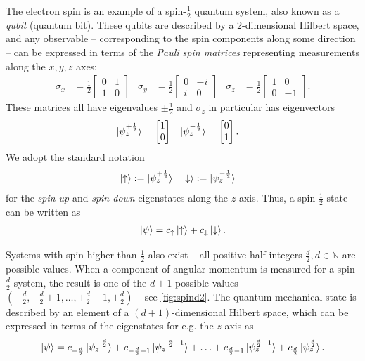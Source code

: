 \documentclass[final,3p,mathptmx]{elsarticle}
\begin{document}
The electron spin is an example of a spin-{$\frac{1}{2}$} quantum system, also known as a \emph{qubit} (quantum bit). These qubits are described by a 2-dimensional Hilbert space, and any observable -- corresponding to the spin components along some direction -- can be expressed in terms of the \emph{Pauli spin matrices} representing measurements along the $x,y,z$ axes:
\begin{align}\label{eq:paulispin}
\sigma_{x} 
&= 
\frac{1}{2}\begin{bmatrix}
0 & 1 \\ 
1 & 0 
\end{bmatrix} 
&
\sigma_{y}
&= 
\frac{1}{2}\begin{bmatrix}
0 & -i \\ 
i & 0 
\end{bmatrix} 
&
\sigma_{z}
&= 
\frac{1}{2}\begin{bmatrix}
1 & 0 \\ 
0 & -1 
\end{bmatrix}.
\end{align}
These matrices all have eigenvalues $\pm \frac{1}{2}$ and $\sigma_{z}$ in particular has eigenvectors 
\begin{align}
\ket{\psi_{z}^{+\frac{1}{2}}} 
&=  
\begin{bmatrix}
1 \\
0
\end{bmatrix} 
&
\ket{\psi_{z}^{-\frac{1}{2}}} 
&= 
\begin{bmatrix}
0 \\
1
\end{bmatrix}.
\end{align}
We adopt the standard notation
\begin{align}
\ket{\uparrow} &:= \ket{\psi_{z}^{+\frac{1}{2}}}  & \ket{\downarrow} &:= \ket{\psi_{z}^{-\frac{1}{2}}} 
\end{align}
for the \emph{spin-up} and \emph{spin-down} eigenstates along the $z$-axis. Thus, a spin-$\frac{1}{2}$ state can be written as
\begin{align}
\ket{\psi} = c_{\uparrow}\ket{\uparrow} + c_{\downarrow}\ket{\downarrow}.
\end{align}

Systems with spin higher than $\frac{1}{2}$ also exist -- all positive half-integers $\frac{d}{2}, d \in \mathbb{N}$ are possible values. When a component of angular momentum is measured for a spin-$\frac{d}{2}$ system, the result is one of the $d+1$ possible values $(-\frac{d}{2}, -\frac{d}{2}+1, \ldots, +\frac{d}{2}-1, +\frac{d}{2})$ -- see \autoref{fig:spind2}. The quantum mechanical state is described by an element of a $(d+1)$-dimensional Hilbert space, which can be expressed in terms of the eigenstates for e.g. the $z$-axis as
\begin{align}
\ket{\psi} = c_{-\frac{d}{2}}\ket{\psi_{z}^{-\frac{d}{2}}} + c_{-\frac{d}{2} + 1}\ket{\psi_{z}^{-\frac{d}{2} + 1}} + \ldots + c_{\frac{d}{2} -1}\ket{\psi_{z}^{\frac{d}{2}-1}} + c_{\frac{d}{2}}\ket{\psi_{z}^{\frac{d}{2}}}.
\end{align}
\end{document}
